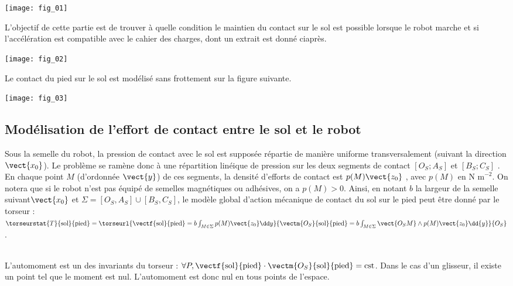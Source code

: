 \begin{multicols}{2}
\begin{center}
\texttt{[image: fig\_01]}
\end{center}
\fi
\begin{obj}
L’objectif de cette partie est de trouver à quelle condition le maintien du contact sur le sol est possible lorsque
le robot marche et si l'accélération est compatible avec le cahier des charges, dont un extrait est donné ciaprès.
\end{obj}

\begin{center}
\texttt{[image: fig\_02]}
\end{center}


\ifprof
\else

Le contact du pied sur le sol est modélisé sans frottement sur la figure suivante.


\begin{center}
\texttt{[image: fig\_03]}
\end{center}
\fi

\subsection*{Modélisation de l’effort de contact entre le sol et le robot}

\ifprof
\else

Sous la semelle du robot, la pression de contact avec le sol est supposée répartie de manière uniforme
transversalement (suivant la direction $\vect{x_0}$). Le problème se ramène donc à une répartition linéique de pression
sur les deux segments de contact $[O_S ;A_S]$ et $[B_S;C_S]$ . En chaque point $M$ (d'ordonnée $\vect{y}$) de ces
segments, la densité d'efforts de contact est $p(M)\vect{z_0}$ , avec $p(M)$ en $\text{N m}^{-2}$. On notera que si le robot n'est pas équipé de semelles magnétiques ou adhésives, on a $p(M)> 0$. Ainsi, en notant $b$ la largeur de la semelle
suivant$\vect{x_0}$ et $\Sigma=[O_S ,A_S]\cup [B_S,C_S]$, le modèle global d'action mécanique de contact du sol sur le pied peut être donné par le torseur :
$
\torseurstat{T}{\text{sol}}{\text{pied}}=\torseurl{\vectf{\text{sol}}{\text{pied}}=b\int_{M\in\Sigma} p(M)\vect{z_0} \dd y }{\vectm{O_S}{\text{sol}}{\text{pied}}=b\int_{M\in\Sigma} \vect{O_S M} \wedge p(M)\vect{z_0} \dd {y}}{O_S}$.

\fi

\ifprof
\begin{corrige}~\\
L'automoment est un des invariants du torseur : $\forall P, \vectf{\text{sol}}{\text{pied}}\cdot\vectm{O_S}{\text{sol}}{\text{pied}}=\text{cst}$. Dans le cas d'un glisseur, il existe un point tel que le moment est nul. L'automoment est donc nul en tous points de l'espace.


\end{corrige}
\end{multicols}
